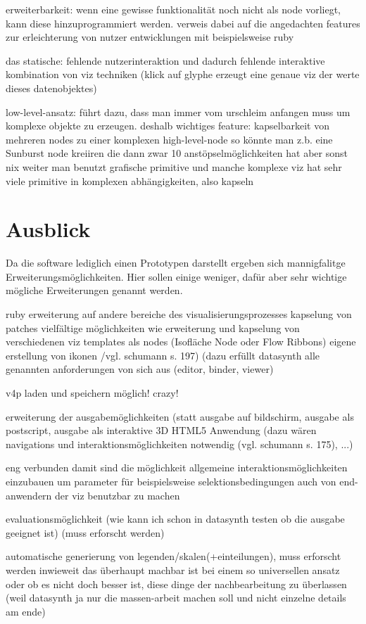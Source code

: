 \documentclass[a4paper, 12pt, DIVcalc, onepage, pdftex, headsepline, footsepline]{scrreprt}
\begin{document}
erweiterbarkeit:
wenn eine gewisse funktionalität noch nicht als node vorliegt, kann diese hinzuprogrammiert
werden. verweis dabei auf die angedachten features zur erleichterung von nutzer entwicklungen
mit beispielsweise ruby

das statische:
fehlende nutzerinteraktion und dadurch fehlende interaktive kombination von viz techniken
(klick auf glyphe erzeugt eine genaue viz der werte dieses datenobjektes)

low-level-ansatz:
führt dazu, dass man immer vom urschleim anfangen muss um komplexe objekte zu erzeugen.
deshalb wichtiges feature: kapselbarkeit von mehreren nodes zu einer komplexen high-level-node
so könnte man z.b. eine Sunburst node kreiiren die dann zwar 10 anstöpselmöglichkeiten hat aber sonst nix weiter
man benutzt grafische primitive und manche komplexe viz hat sehr viele primitive in komplexen abhängigkeiten, also kapseln

\section{Ausblick}
\label{sec:Ausblick}
Da die software lediglich einen Prototypen darstellt ergeben sich mannigfalitge
Erweiterungsmöglichkeiten. Hier sollen einige weniger, dafür aber sehr wichtige
mögliche Erweiterungen genannt werden.

ruby
erweiterung auf andere bereiche des visualisierungsprozesses
kapselung von patches
  vielfältige möglichkeiten wie
    erweiterung und kapselung von verschiedenen viz templates als nodes (Isofläche Node oder Flow Ribbons)
    eigene erstellung von ikonen /vgl. schumann s. 197)
    (dazu erfüllt datasynth alle genannten anforderungen von sich aus (editor, binder, viewer)

v4p laden und speichern möglich! crazy!

erweiterung der ausgabemöglichkeiten (statt ausgabe auf bildschirm, ausgabe als
postscript, ausgabe als interaktive 3D HTML5 Anwendung (dazu wären navigations
und interaktionsmöglichkeiten notwendig (vgl. schumann s. 175), ...)

eng verbunden damit sind die möglichkeit allgemeine interaktionsmöglichkeiten
einzubauen um parameter für beispielsweise selektionsbedingungen auch von
end-anwendern der viz benutzbar zu machen

evaluationsmöglichkeit (wie kann ich schon in datasynth testen ob die ausgabe
geeignet ist) (muss erforscht werden)

automatische generierung von legenden/skalen(+einteilungen), muss erforscht
werden inwieweit das überhaupt machbar ist bei einem so universellen ansatz
oder ob es nicht doch besser ist, diese dinge der nachbearbeitung zu überlassen
(weil datasynth ja nur die massen-arbeit machen soll und nicht einzelne details am ende)
\end{document}
